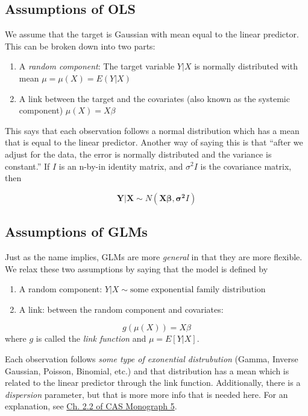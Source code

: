 \documentclass[
  openany]{book}
\begin{document}
\hypertarget{assumptions-of-ols}{%
\subsection{Assumptions of OLS}\label{assumptions-of-ols}}

We assume that the target is Gaussian with mean equal to the linear predictor. This can be broken down into two parts:

\begin{enumerate}
\def\labelenumi{\arabic{enumi}.}
\item
  A \emph{random component}: The target variable \(Y|X\) is normally distributed with mean \(\mu = \mu(X) = E(Y|X)\)
\item
  A link between the target and the covariates (also known as the systemic component) \(\mu(X) = X\beta\)
\end{enumerate}

This says that each observation follows a normal distribution which has a mean that is equal to the linear predictor. Another way of saying this is that ``after we adjust for the data, the error is normally distributed and the variance is constant.'' If \(I\) is an n-by-in identity matrix, and \(\sigma^2 I\) is the covariance matrix, then

\[
\mathbf{Y|X} \sim N( \mathbf{X \beta}, \mathbf{\sigma^2} I)
\]

\hypertarget{assumptions-of-glms}{%
\subsection{Assumptions of GLMs}\label{assumptions-of-glms}}

Just as the name implies, GLMs are more \emph{general} in that they are more flexible. We relax these two assumptions by saying that the model is defined by

\begin{enumerate}
\def\labelenumi{\arabic{enumi}.}
\item
  A random component: \(Y|X \sim \text{some exponential family distribution}\)
\item
  A link: between the random component and covariates:
\end{enumerate}

\[g(\mu(X)) = X\beta\]
where \(g\) is called the \emph{link function} and \(\mu = E[Y|X]\).

Each observation follows \emph{some type of exonential distrubution} (Gamma, Inverse Gaussian, Poisson, Binomial, etc.) and that distribution has a mean which is related to the linear predictor through the link function. Additionally, there is a \emph{dispersion} parameter, but that is more more info that is needed here. For an explanation, see \href{https://contentpreview.s3.us-east-2.amazonaws.com/CAS+Monograph+5+-+Generalized+Linear+Models+for+Insurance+Ratemaking.pdf}{Ch. 2.2 of CAS Monograph 5}.
\end{document}
